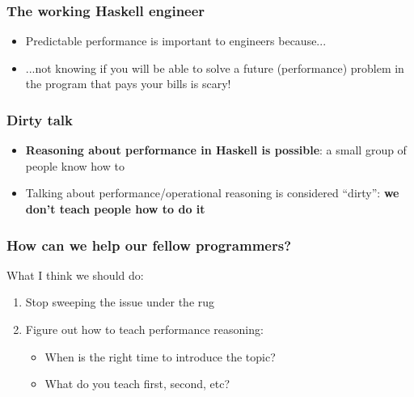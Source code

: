 \documentclass[xetex,mathserif,serif]{beamer}
\begin{document}
\begin{frame}
  \frametitle{The working Haskell engineer}
  \begin{itemize}
  \item Predictable performance is important to engineers because...
  \item ...not knowing if you will be able to solve a future
    (performance) problem in the program that pays your bills is
    scary!
  \end{itemize}
\end{frame}

\begin{frame}
  \frametitle{Dirty talk}
  \begin{itemize}
  \item \textbf{Reasoning about performance in Haskell is possible}: a
    small group of people know how to
  \item Talking about performance/operational reasoning is considered
    ``dirty'': \textbf{we don't teach people how to do it}
  \end{itemize}
\end{frame}

\begin{frame}
  \frametitle{How can we help our fellow programmers?}
  What I think we should do:
  \begin{enumerate}
  \item Stop sweeping the issue under the rug
  \item Figure out how to teach performance reasoning:
    \begin{itemize}
    \item When is the right time to introduce the topic?
    \item What do you teach first, second, etc?
    \end{itemize}
  \end{enumerate}
\end{frame}
\end{document}
